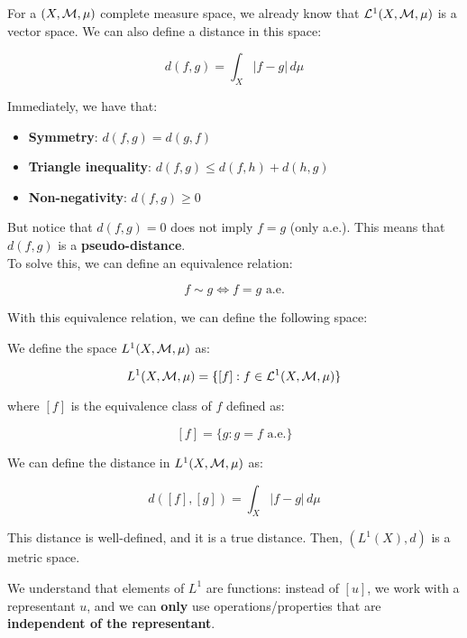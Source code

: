 For a $(X, \mathcal{M}, \mu)$ complete measure space, we already know that
$\mathcal{L}^1(X, \mathcal{M}, \mu)$ is a vector space. We can also define a distance
in this space:

$$d(f, g) = \int_{X} |f - g| \, d\mu$$

Immediately, we have that:

\begin{itemize}
    \item \textbf{Symmetry}: $d(f, g) = d(g, f)$
    
    \item \textbf{Triangle inequality}: $d(f, g) \leq d(f, h) + d(h, g)$
    
    \item \textbf{Non-negativity}: $d(f, g) \geq 0$
\end{itemize}

But notice that $d(f, g) = 0$ does not imply $f = g$ (only a.e.).
This means that $d(f, g)$ is a \textbf{pseudo-distance}.\\

To solve this, we can define an equivalence relation:

$$f \sim g \iff f = g \text{ a.e.}$$

With this equivalence relation, we can define the following space:

\begin{fdefinition}
    We define the space $L^1(X, \mathcal{M}, \mu)$ as:

    $$L^1(X, \mathcal{M}, \mu) = \{[f]: f \in \mathcal{L}^1(X, \mathcal{M}, \mu)\}$$

    where $[f]$ is the equivalence class of $f$ defined as:

    $$[f] = \{g: g = f \text{ a.e.}\}$$
\end{fdefinition}

\begin{fremark}
    We can define the distance in $L^1(X, \mathcal{M}, \mu)$ as:

    $$d([f], [g]) = \int_{X} |f - g| \, d\mu$$

    This distance is well-defined, and it is a true distance.
    Then, $(L^1(X), d)$ is a metric space.
\end{fremark}

\begin{note}
We understand that elements of $L^1$ are functions: instead of $[u]$,
we work with a representant $u$, and we can \textbf{only} use 
operations/properties that are \textbf{independent of the representant}.
\end{note}

